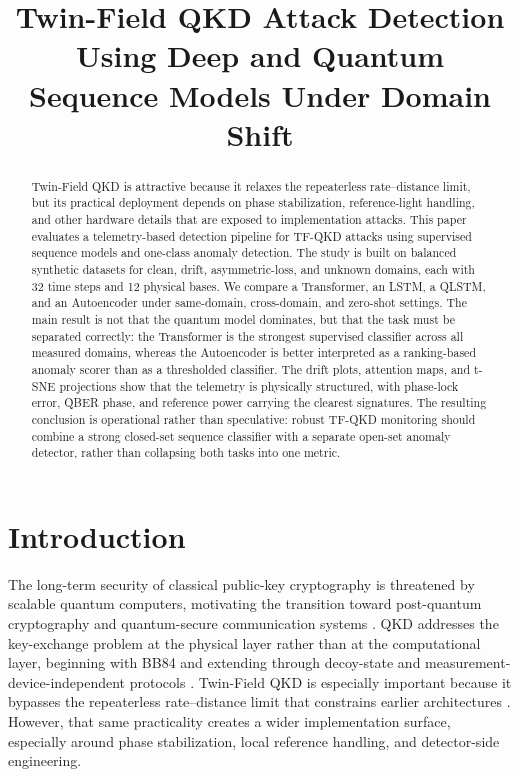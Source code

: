 \newtheorem{theorem}{Theorem}
\newtheorem{definition}{Definition}



\title{Twin-Field QKD Attack Detection Using Deep and Quantum Sequence Models Under Domain Shift}

\author{
}

\maketitle


\begin{abstract}
Twin-Field QKD is attractive because it relaxes the repeaterless rate--distance limit, but its practical deployment depends on phase stabilization, reference-light handling, and other hardware details that are exposed to implementation attacks. This paper evaluates a telemetry-based detection pipeline for TF-QKD attacks using supervised sequence models and one-class anomaly detection. The study is built on balanced synthetic datasets for clean, drift, asymmetric-loss, and unknown domains, each with 32 time steps and 12 physical bases. We compare a Transformer, an LSTM, a QLSTM, and an Autoencoder under same-domain, cross-domain, and zero-shot settings. The main result is not that the quantum model dominates, but that the task must be separated correctly: the Transformer is the strongest supervised classifier across all measured domains, whereas the Autoencoder is better interpreted as a ranking-based anomaly scorer than as a thresholded classifier. The drift plots, attention maps, and t-SNE projections show that the telemetry is physically structured, with phase-lock error, QBER phase, and reference power carrying the clearest signatures. The resulting conclusion is operational rather than speculative: robust TF-QKD monitoring should combine a strong closed-set sequence classifier with a separate open-set anomaly detector, rather than collapsing both tasks into one metric.
\end{abstract}


\section{Introduction}
The long-term security of classical public-key cryptography is threatened by scalable quantum computers, motivating the transition toward post-quantum cryptography and quantum-secure communication systems \cite{preskill2018quantum, shor1999polynomial, csrcNIST}. QKD addresses the key-exchange problem at the physical layer rather than at the computational layer, beginning with BB84 and extending through decoy-state and measurement-device-independent protocols \cite{bb84, pns, hwang, lo2005, mdi}. Twin-Field QKD is especially important because it bypasses the repeaterless rate--distance limit that constrains earlier architectures \cite{tfqkd}. However, that same practicality creates a wider implementation surface, especially around phase stabilization, local reference handling, and detector-side engineering.

